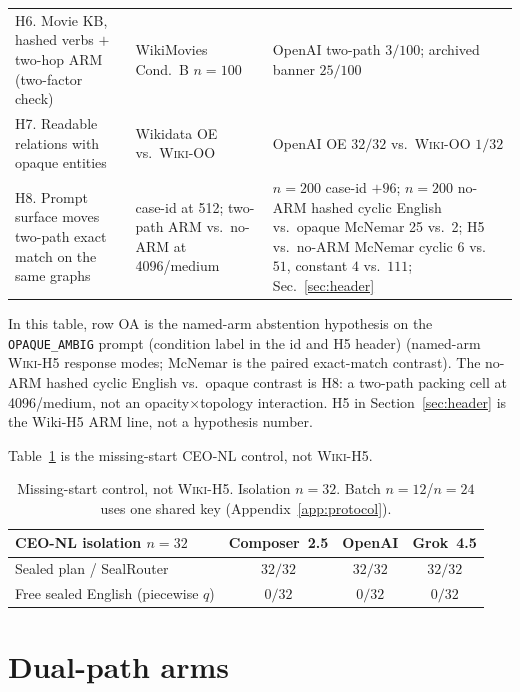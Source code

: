 \documentclass[10pt]{article} %
\begin{document}
\begin{table}[h]
\begin{tabularx}{\linewidth}{@{}
  >{\raggedright\arraybackslash}p{4.05cm}
  >{\raggedright\arraybackslash}X
  >{\raggedright\arraybackslash}p{4.05cm}@{}}
H6. Movie KB, hashed verbs $+$ two-hop ARM (two-factor check) & WikiMovies Cond.\ B $n{=}100$ & OpenAI two-path $3/100$; archived banner $25/100$ \\
H7. Readable relations with opaque entities & Wikidata OE vs.\ \textsc{Wiki-OO} & OpenAI OE $32/32$ vs.\ \textsc{Wiki-OO} $1/32$ \\
H8. Prompt surface moves two-path exact match on the same graphs & case-id at 512; two-path ARM vs.\ no-ARM at 4096/medium & $n{=}200$ case-id ${+}96$; $n{=}200$ no-ARM hashed cyclic English vs.\ opaque McNemar 25 vs.\ 2; H5 vs.\ no-ARM McNemar cyclic $6$ vs.\ $51$, constant $4$ vs.\ $111$; Sec.~\ref{sec:header} \\
\bottomrule
\end{tabularx}

\end{table}

In this table, row OA is the named-arm abstention hypothesis on the
\texttt{OPAQUE\_AMBIG} prompt (condition label in the id and H5 header)
(named-arm \textsc{Wiki-H5} response modes; McNemar is the paired
exact-match contrast).
The no-ARM hashed cyclic English vs.\ opaque contrast is H8: a two-path
packing cell at 4096/medium, not an opacity$\times$topology interaction.
H5 in Section~\ref{sec:header} is the Wiki-H5 ARM line, not a hypothesis
number.

Table~\ref{tab:primary} is the missing-start CEO-NL control, not
\textsc{Wiki-H5}.

\begin{table}[h]
\centering
\small

\caption{Missing-start control, not \textsc{Wiki-H5}. Isolation $n{=}32$.
Batch $n{=}12$/$n{=}24$ uses one shared key (Appendix~\ref{app:protocol}).}
\label{tab:primary}
\begin{tabular}{@{}lccc@{}}
\toprule
\textsc{CEO-NL} isolation $n{=}32$ & Composer~2.5 & OpenAI & Grok~4.5 \\
\midrule
Sealed plan / SealRouter & $32/32$ & $32/32$ & $32/32$ \\
Free sealed English (piecewise $q$) & $0/32$ & $0/32$ & $0/32$ \\
\bottomrule
\end{tabular}

\end{table}
\FloatBarrier

\section{Dual-path arms}
\label{app:dual}
\end{document}

